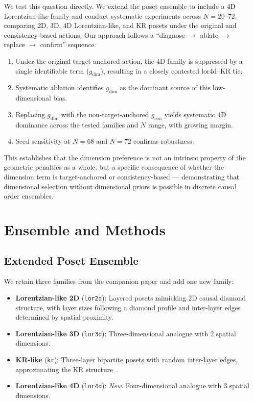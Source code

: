 \documentclass[11pt,a4paper]{article}
\begin{document}
We test this question directly. We extend the poset ensemble to include a 4D Lorentzian-like family and conduct systematic experiments across $N = 20$--$72$, comparing 2D, 3D, 4D Lorentzian-like, and KR posets under the original and consistency-based actions. Our approach follows a ``diagnose $\to$ ablate $\to$ replace $\to$ confirm'' sequence:

\begin{enumerate}[nosep]
    \item Under the original target-anchored action, the 4D family is suppressed by a single identifiable term ($g_{\text{dim}}$), resulting in a closely contested lor4d--KR tie.
    \item Systematic ablation identifies $g_{\text{dim}}$ as the dominant source of this low-dimensional bias.
    \item Replacing $g_{\text{dim}}$ with the non-target-anchored $g_{\text{con}}$ yields systematic 4D dominance across the tested families and $N$ range, with growing margin.
    \item Seed sensitivity at $N = 68$ and $N = 72$ confirms robustness.
\end{enumerate}

This establishes that the dimension preference is not an intrinsic property of the geometric penalties as a whole, but a specific consequence of whether the dimension term is target-anchored or consistency-based --- demonstrating that dimensional selection without dimensional priors is possible in discrete causal order ensembles.

\section{Ensemble and Methods}

\subsection{Extended Poset Ensemble}

We retain three families from the companion paper and add one new family:

\begin{itemize}[nosep]
    \item \textbf{Lorentzian-like 2D} (\texttt{lor2d}): Layered posets mimicking 2D causal diamond structure, with layer sizes following a diamond profile and inter-layer edges determined by spatial proximity.
    \item \textbf{Lorentzian-like 3D} (\texttt{lor3d}): Three-dimensional analogue with 2 spatial dimensions.
    \item \textbf{KR-like} (\texttt{kr}): Three-layer bipartite posets with random inter-layer edges, approximating the KR structure~\cite{kleitman1975}.
    \item \textbf{Lorentzian-like 4D} (\texttt{lor4d}): \emph{New}. Four-dimensional analogue with 3 spatial dimensions.
\end{itemize}
\end{document}
